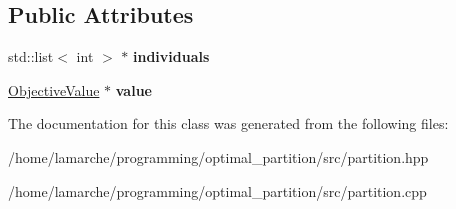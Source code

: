\subsection*{Public Attributes}
\begin{DoxyCompactItemize}
\item 
\hypertarget{classPart_a12f364b91efb5702af492cbdef1990fe}{std\-::list$<$ int $>$ $\ast$ {\bfseries individuals}}\label{classPart_a12f364b91efb5702af492cbdef1990fe}

\item 
\hypertarget{classPart_af9f5786f51cc11cffcf5c77ea656ae40}{\hyperlink{classObjectiveValue}{Objective\-Value} $\ast$ {\bfseries value}}\label{classPart_af9f5786f51cc11cffcf5c77ea656ae40}

\end{DoxyCompactItemize}


The documentation for this class was generated from the following files\-:\begin{DoxyCompactItemize}
\item 
/home/lamarche/programming/optimal\-\_\-partition/src/partition.\-hpp\item 
/home/lamarche/programming/optimal\-\_\-partition/src/partition.\-cpp\end{DoxyCompactItemize}
